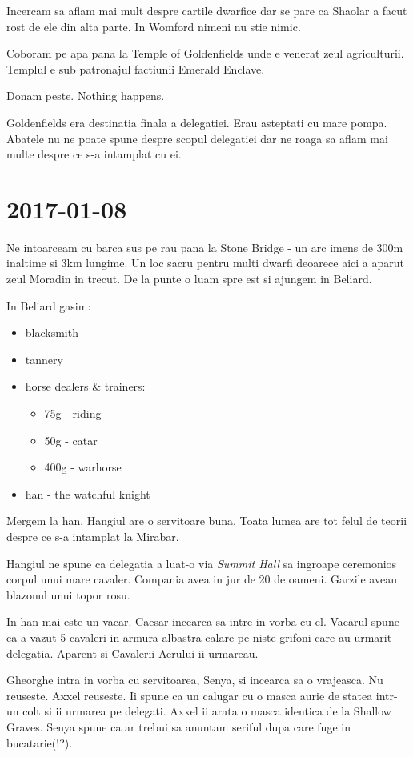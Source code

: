 \documentclass[12pt,oneside]{book}
\begin{document}
Incercam sa aflam mai mult despre cartile dwarfice dar se pare ca Shaolar a
facut rost de ele din alta parte. In Womford nimeni nu stie nimic.

Coboram pe apa pana la Temple of Goldenfields unde e venerat zeul 
agriculturii. Templul e sub patronajul factiunii Emerald Enclave. 

Donam peste. Nothing happens.

Goldenfields era destinatia finala a delegatiei. Erau asteptati cu mare
pompa. Abatele nu ne poate spune despre scopul delegatiei dar ne roaga
sa aflam mai multe despre ce s-a intamplat cu ei. 

\section{2017-01-08}

Ne intoarceam cu barca sus pe rau pana la Stone Bridge - un arc imens de 300m
inaltime si 3km lungime. Un loc sacru pentru multi dwarfi deoarece aici a aparut
zeul Moradin in trecut.
De la punte o luam spre est si ajungem in Beliard.

In Beliard gasim:
\begin{itemize}
	\item blacksmith
	\item tannery
	\item horse dealers & trainers:
		\begin{itemize}
			\item 75g - riding
			\item 50g - catar
			\item 400g - warhorse
		\end{itemize}
	\item han - the watchful knight
\end{itemize}

Mergem la han. Hangiul are o servitoare buna.
Toata lumea are tot felul de teorii despre ce s-a intamplat la Mirabar.

Hangiul ne spune ca delegatia a luat-o via \textit{Summit Hall} sa ingroape 
ceremonios corpul unui mare cavaler. Compania avea in jur de 20 de oameni. Garzile 
aveau blazonul unui topor rosu.

In han mai este un vacar. Caesar incearca sa intre in vorba cu el.
Vacarul spune ca a vazut 5 cavaleri in armura albastra calare pe niste 
grifoni care au urmarit delegatia. Aparent si Cavalerii Aerului ii urmareau.

Gheorghe intra in vorba cu servitoarea, Senya, si incearca sa o vrajeasca. Nu reuseste.
Axxel reuseste. Ii spune ca un calugar cu o masca aurie de statea intr-un colt si ii 
urmarea pe delegati. Axxel ii arata o masca identica de la Shallow Graves. Senya spune ca 
ar trebui sa anuntam seriful dupa care fuge in bucatarie(!?).
\end{document}
